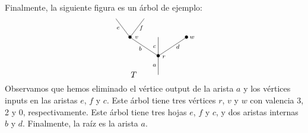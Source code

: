 \documentclass[../main.tex]{subfiles}
\begin{document}
Finalmente, la siguiente figura es un \'arbol de ejemplo:
\begin{equation}
    \xy
    <0.08cm, 0cm>:
    (0.0, 0.0)*{}="1"; %
    (0.0, 10.0)*=0{\bullet}="2"; %
    (-15.0, 20.0)*=0{\bullet}="3"; %
    (-22.5, 30.0)*{}="4"; %
    (-7.5, 30.0)*{}="5"; %
    (0.0, 20.0)*{}="6"; %
    (15.0, 20.0)*=0{\bullet}="7"; %
    "1";"2" **\dir{-};
    "2";"3" **\dir{-};
    "3";"4" **\dir{-};
    "3";"5" **\dir{-};
    "2";"6" **\dir{-};
    "2";"7" **\dir{-};
    (3.0, 9.5)*=0{\scriptstyle r};
    (-11.5, 20.0)*=0{\scriptstyle v};
    (-2.0, 5.0)*=0{\scriptstyle a};
    (-9.5, 14.0)*=0{\scriptstyle b};
    (-21.3, 25.0)*=0{\scriptstyle e};
    (-9, 25.0)*=0{\scriptstyle f};
    (-2.0, 15.0)*=0{\scriptstyle c};
    (10.4, 15.0)*=0{\scriptstyle d};
    (18.0, 20.0)*=0{\scriptstyle w};
    (-13,0)*{T};
    \endxy
\end{equation}
Observamos que hemos eliminado el v\'ertice output de la arista $a$ y los v\'ertices inputs en las aristas $e$, $f$ y $c$. Este \'arbol tiene tres v\'ertices $r$, $v$ y $w$ con valencia 3, 2 y 0, respectivamente.
Este \'arbol tiene tres hojas $e$, $f$ y $c$, y dos aristas internas $b$ y $d$. Finalmente, la ra\'iz es la arista $a$.
\end{document}
